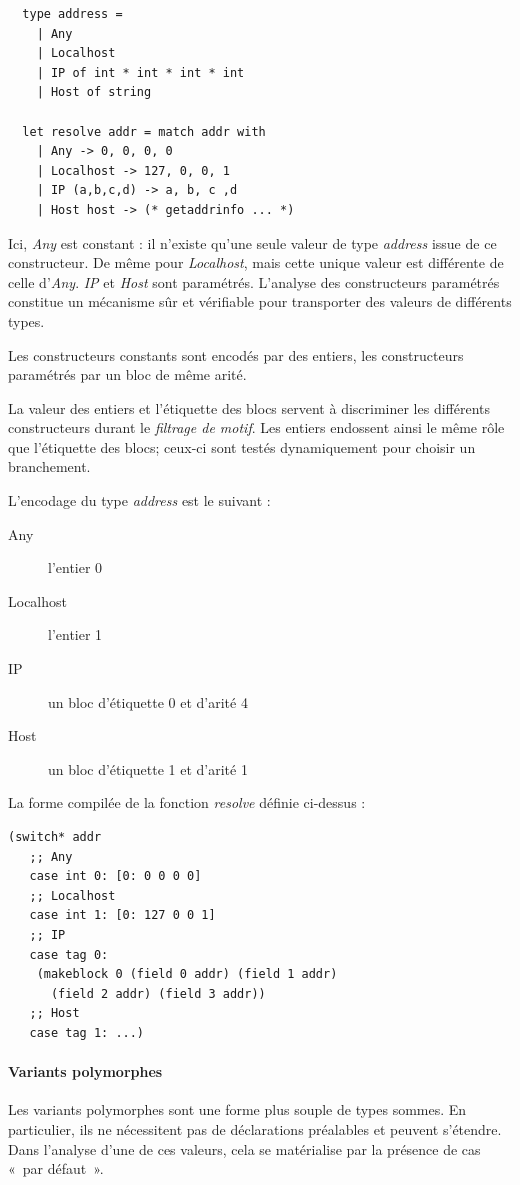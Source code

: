 \begin{lstlisting}
  type address =
    | Any
    | Localhost
    | IP of int * int * int * int
    | Host of string

  let resolve addr = match addr with
    | Any -> 0, 0, 0, 0
    | Localhost -> 127, 0, 0, 1
    | IP (a,b,c,d) -> a, b, c ,d
    | Host host -> (* getaddrinfo ... *)
\end{lstlisting}

Ici, \emph{Any} est constant : il n'existe qu'une seule valeur de type
\emph{address} issue de ce constructeur. De même pour \emph{Localhost}, mais
cette unique valeur est différente de celle d'\emph{Any}. \emph{IP} et
\emph{Host} sont paramétrés.  L'analyse des constructeurs paramétrés constitue
un mécanisme sûr et vérifiable pour transporter des valeurs de différents types.

Les constructeurs constants sont encodés par des entiers, les constructeurs
paramétrés par un bloc de même arité.

La valeur des entiers et l'étiquette des blocs servent à discriminer les
différents constructeurs durant le \emph{filtrage de motif}. Les entiers
endossent ainsi le même rôle que l'étiquette des blocs; ceux-ci sont testés
dynamiquement pour choisir un branchement.

L'encodage du type \emph{address} est le suivant :
\begin{description}
  \item[Any] l'entier 0
  \item[Localhost] l'entier 1
  \item[IP] un bloc d'étiquette 0 et d'arité 4
  \item[Host] un bloc d'étiquette 1 et d'arité 1
\end{description}

La forme compilée de la fonction \emph{resolve} définie ci-dessus :

\lstset{language=Lisp}
\begin{lstlisting}
(switch* addr
   ;; Any
   case int 0: [0: 0 0 0 0]
   ;; Localhost
   case int 1: [0: 127 0 0 1]
   ;; IP
   case tag 0:
    (makeblock 0 (field 0 addr) (field 1 addr)
      (field 2 addr) (field 3 addr))
   ;; Host
   case tag 1: ...)
\end{lstlisting}
\lstset{language=Caml}

\paragraph{Variants polymorphes} 
Les variants polymorphes sont une forme plus souple de types sommes. En
particulier, ils ne nécessitent pas de déclarations préalables et peuvent
s'étendre. Dans l'analyse d'une de ces valeurs, cela se matérialise par la
présence de cas « par défaut ».

